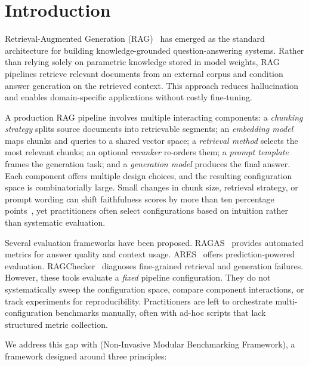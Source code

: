 \section{Introduction}
\label{sec:intro}

Retrieval-Augmented Generation (RAG)~\cite{lewis2020retrieval} has emerged as the standard architecture for building knowledge-grounded question-answering systems. Rather than relying solely on parametric knowledge stored in model weights, RAG pipelines retrieve relevant documents from an external corpus and condition answer generation on the retrieved context. This approach reduces hallucination~\cite{shuster2021retrieval} and enables domain-specific applications without costly fine-tuning.

A production RAG pipeline involves multiple interacting components: a \emph{chunking strategy} splits source documents into retrievable segments; an \emph{embedding model} maps chunks and queries to a shared vector space; a \emph{retrieval method} selects the most relevant chunks; an optional \emph{reranker} re-orders them; a \emph{prompt template} frames the generation task; and a \emph{generation model} produces the final answer. Each component offers multiple design choices, and the resulting configuration space is combinatorially large. Small changes in chunk size, retrieval strategy, or prompt wording can shift faithfulness scores by more than ten percentage points~\cite{chen2024benchmarking}, yet practitioners often select configurations based on intuition rather than systematic evaluation.

Several evaluation frameworks have been proposed. RAGAS~\cite{es2023ragas} provides automated metrics for answer quality and context usage. ARES~\cite{esphandiary2024areval} offers prediction-powered evaluation. RAGChecker~\cite{izrailovsky2024rag} diagnoses fine-grained retrieval and generation failures. However, these tools evaluate a \emph{fixed} pipeline configuration. They do not systematically sweep the configuration space, compare component interactions, or track experiments for reproducibility. Practitioners are left to orchestrate multi-configuration benchmarks manually, often with ad-hoc scripts that lack structured metric collection.

We address this gap with \toolname{} (Non-Invasive Modular Benchmarking Framework), a framework designed around three principles:


